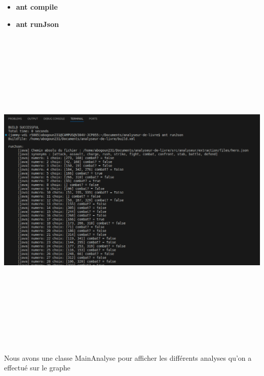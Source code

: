 \documentclass[12pt]{article}
\begin{document}
\begin{itemize}
 \item \textbf{ant compile}
 \item \textbf{ant runJson}
 
\end{itemize}
\includegraphics[width=16cm,height=16cm]{images/json.png}

Nous avons une classe MainAnalyse pour afficher les différents analyses qu'on a effectué sur le graphe
\end{document}
